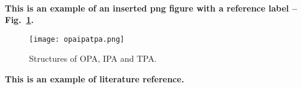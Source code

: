
\lipsum[1]
\\

\textbf{This is an example of an inserted png figure with a reference label -- Fig.~\ref{fig:opaipatpa}.}
 
\begin{figure}[!ht]
  \centering
 \texttt{[image: opaipatpa.png]}
 \caption{Structures of OPA, IPA and TPA.}
 \label{fig:opaipatpa}
\end{figure}

\textbf{This is an example of literature reference.}\cite{McKenzie2002} \\
